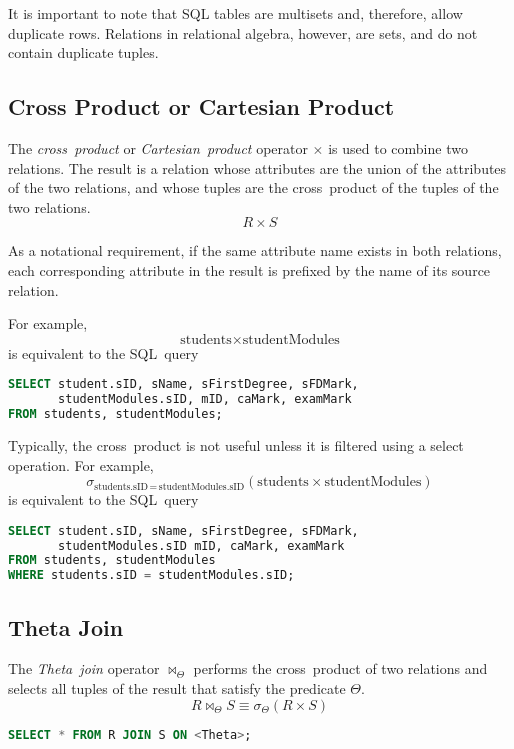 It is important to note that SQL tables are multisets and, therefore, allow duplicate rows.
Relations in relational algebra, however, are sets, and do not contain duplicate tuples.

\subsection{Cross Product or Cartesian Product}

The \emph{cross~product} or \emph{Cartesian~product} operator \( \times \) is used to combine two relations.
The result is a relation whose attributes are the union of the attributes of the two relations, and whose tuples are the cross~product of the tuples of the two relations.
\begin{equation*}
  R \times S
\end{equation*}

As a notational requirement, if the same attribute name exists in both relations, each corresponding attribute in the result is prefixed by the name of its source relation.

For example,
\begin{equation*}
  \text{students} \times \text{studentModules}
\end{equation*}
is equivalent to the SQL~query
\begin{lstlisting}[language={SQL}]
SELECT student.sID, sName, sFirstDegree, sFDMark,
       studentModules.sID, mID, caMark, examMark
FROM students, studentModules;
\end{lstlisting}

Typically, the cross~product is not useful unless it is filtered using a select operation.
For example,
\begin{equation*}
  \sigma_{\text{students.sID}\,=\,\text{studentModules.sID}}\!\left( \text{students} \times \text{studentModules} \right)
\end{equation*}
is equivalent to the SQL~query
\begin{lstlisting}[language={SQL}]
SELECT student.sID, sName, sFirstDegree, sFDMark,
       studentModules.sID mID, caMark, examMark
FROM students, studentModules
WHERE students.sID = studentModules.sID;
\end{lstlisting}

\subsection{Theta Join}

The \emph{Theta~join} operator \( \bowtie_{\Theta} \) performs the cross~product of two relations and selects all tuples of the result that satisfy the predicate \( \Theta \).
\begin{equation*}
  R \bowtie_{\Theta} S \equiv \sigma_{\Theta}\!\left( R \times S \right)
\end{equation*}
\begin{lstlisting}[language={SQL}]
SELECT * FROM R JOIN S ON <Theta>;
\end{lstlisting}

